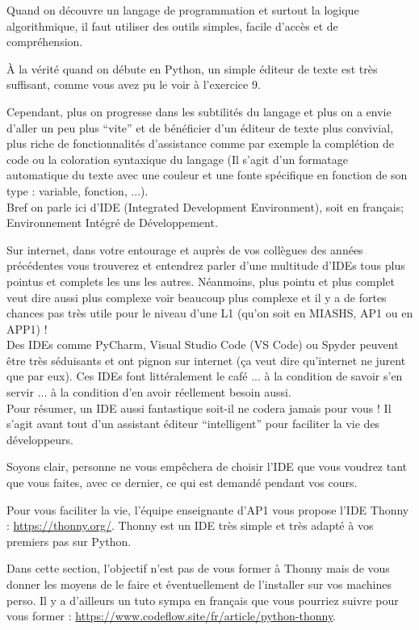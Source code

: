 \documentclass{article}
\begin{document}
Quand on découvre un langage de programmation et surtout la logique algorithmique, il faut utiliser des outils simples, facile d'accès et de compréhension.

À la vérité quand on débute en Python, un simple éditeur de texte est très suffisant, comme vous avez pu le voir à l'exercice 9. 

Cependant, plus on progresse dans les subtilités du langage et plus on a envie d'aller un peu plus ``vite'' et de bénéficier d'un éditeur de texte plus convivial, plus riche de fonctionnalités d'assistance comme par exemple la complétion de code ou la coloration syntaxique du langage (Il s'agit d'un formatage automatique du texte avec une couleur et une fonte spécifique en fonction de son type : variable, fonction, ...). \\
Bref on parle ici d'IDE (Integrated Development Environment), soit en fran\c cais; Environnement Intégré de Développement.

Sur internet, dans votre entourage et auprès de vos collègues des années précédentes vous trouverez et entendrez parler d'une multitude d'IDEs tous plus pointus et complets les uns les autres. Néanmoins, plus pointu et plus complet veut dire aussi plus complexe voir beaucoup plus complexe et il y a de fortes chances pas très utile pour le niveau d'une L1 (qu'on soit en MIASHS, AP1 ou en APP1) ! \\
Des IDEs comme PyCharm, Visual Studio Code (VS Code) ou Spyder peuvent être très séduisants et ont pignon sur internet (\c ca veut dire qu'internet ne jurent que par eux). Ces IDEs font littéralement le café ... à la condition de savoir s'en servir ... à la condition d'en avoir réellement besoin aussi. \\
Pour résumer, un IDE aussi fantastique soit-il ne codera jamais pour vous ! Il s'agit avant tout d'un assistant éditeur ``intelligent'' pour faciliter la vie des développeurs. 

Soyons clair, personne ne vous empêchera de choisir l'IDE que vous voudrez tant que vous faites, avec ce dernier, ce qui est demandé pendant vos cours.

Pour vous faciliter la vie, l'équipe enseignante d'AP1 vous propose l'IDE Thonny : \url{https://thonny.org/}. Thonny est un IDE très simple et très adapté à vos premiers pas sur Python. 

Dans cette section, l'objectif n'est pas de vous former à Thonny mais de vous donner les moyens de le faire et éventuellement de l'installer sur vos machines perso. Il y a d'ailleurs un tuto sympa en fran\c cais que vous pourriez suivre pour vous former : \url{https://www.codeflow.site/fr/article/python-thonny}.
\end{document}
